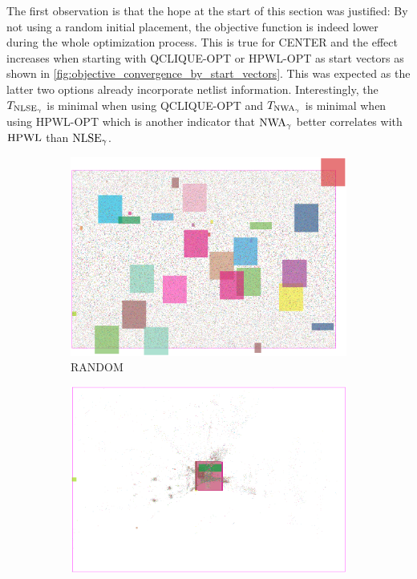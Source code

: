 The first observation is that the hope at the start of this section was justified:
By not using a random initial placement, the objective function is indeed lower during the whole optimization process.
This is true for CENTER and the effect increases when starting with QCLIQUE-OPT or HPWL-OPT as start vectors
as shown in \cref{fig:objective_convergence_by_start_vectors}.
This was expected as the latter two options already incorporate netlist information.
Interestingly, the \(T_{\operatorname{NLSE}_\gamma}\) is minimal when using QCLIQUE-OPT
and \(T_{\operatorname{NWA}_\gamma}\) is minimal when using HPWL-OPT
which is another indicator that \(\operatorname{NWA}_\gamma\) better correlates with \(\operatorname{HPWL}\) than \(\operatorname{NLSE}_\gamma\).

\begin{figure}
 \centering

 \begin{subfigure}{.32\textwidth}
  \includegraphics[width=\textwidth]{start_vectors/convergence_Chip1_random.png}  
  \caption{RANDOM}
 \end{subfigure}
 \hfill
 \begin{subfigure}{.32\textwidth}
  \includegraphics[width=\textwidth]{start_vectors/convergence_Chip1_LSE_random_100000_gamma.png}  

\end{subfigure}
\end{figure}
